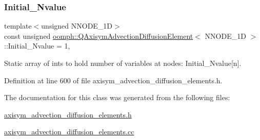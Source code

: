 \subsubsection{\texorpdfstring{Initial\+\_\+\+Nvalue}{Initial\_Nvalue}}
{\footnotesize\ttfamily template$<$unsigned N\+N\+O\+D\+E\+\_\+1D$>$ \\
const unsigned \hyperlink{classoomph_1_1QAxisymAdvectionDiffusionElement}{oomph\+::\+Q\+Axisym\+Advection\+Diffusion\+Element}$<$ N\+N\+O\+D\+E\+\_\+1D $>$\+::Initial\+\_\+\+Nvalue = 1\hspace{0.3cm}{\ttfamily [static]}, {\ttfamily [private]}}



Static array of ints to hold number of variables at nodes\+: Initial\+\_\+\+Nvalue\mbox{[}n\mbox{]}. 



Definition at line 600 of file axisym\+\_\+advection\+\_\+diffusion\+\_\+elements.\+h.



The documentation for this class was generated from the following files\+:\begin{DoxyCompactItemize}
\item 
\hyperlink{axisym__advection__diffusion__elements_8h}{axisym\+\_\+advection\+\_\+diffusion\+\_\+elements.\+h}\item 
\hyperlink{axisym__advection__diffusion__elements_8cc}{axisym\+\_\+advection\+\_\+diffusion\+\_\+elements.\+cc}\end{DoxyCompactItemize}
